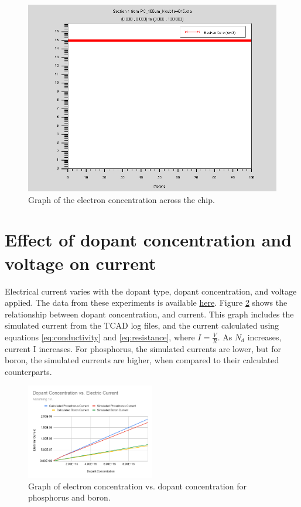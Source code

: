 \documentclass[12pt]{article}
\begin{document}
\begin{figure}[H]
  \centering
  \includegraphics[width=\textwidth]{econc}
  \caption{Graph of the electron concentration across the chip.}
  \label{fig:econc}
\end{figure}

\section{Effect of dopant concentration and voltage on current}
Electrical current varies with the dopant type, dopant concentration, and voltage applied. The data from these experiments is available \href{https://docs.google.com/spreadsheets/d/1gYwgjLNNKRn5CSeJdrwOt3nx-jSYUwJLR_BUbzWCe9E/edit?usp=sharing}{here}. Figure \ref{fig:concvcurrent} shows the relationship between dopant concentration, and current. This graph includes the simulated current from the TCAD log files, and the current calculated using equations \eqref{eq:conductivity} and \eqref{eq:resistance}, where $I=\frac{V}{R}$. As $N_d$ increases, current {{I}} increases. For phosphorus, the simulated currents are lower, but for boron, the simulated currents are higher, when compared to their calculated counterparts.

\begin{figure}[H]
  \centering
  \includegraphics[width=0.5\textwidth]{concvcurrent}
  \caption{Graph of electron concentration vs. dopant concentration for phosphorus and boron.}
  \label{fig:concvcurrent}
\end{figure}
\end{document}
